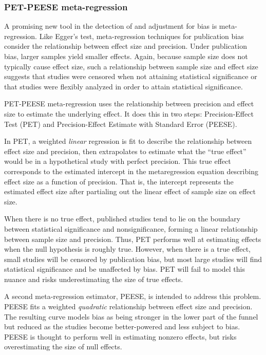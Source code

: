 \documentclass[man]{apa6}
\begin{document}
\subsubsection{PET-PEESE meta-regression}
A promising new tool in the detection of and adjustment for bias is meta-regression. Like Egger's test, meta-regression techniques for publication bias consider the relationship between effect size and precision. Under publication bias, larger samples yield smaller effects. Again, because sample size does not typically cause effect size, such a relationship between sample size and effect size suggests that studies were censored when not attaining statistical significance or that studies were flexibly analyzed in order to attain statistical significance. 

PET-PEESE meta-regression \citep{Stanley:Doucouliagos:2013} %
uses the relationship between precision and effect size to estimate the underlying effect. It does this in two steps: Precision-Effect Test (PET) and Precision-Effect Estimate with Standard Error (PEESE). 

In PET, a weighted {\em linear} regression is fit to describe the relationship between effect size and precision, then extrapolates to estimate what the ``true effect'' would be in a hypothetical study with perfect precision. This true effect corresponds to the estimated intercept in the metaregression equation describing effect size as a function of precision. That is, the intercept represents the estimated effect size after partialing out the linear effect of sample size on effect size.

When there is no true effect, published studies tend to lie on the boundary between statistical significance and nonsignificance, forming a linear relationship between sample size and precision. Thus, PET performs well at estimating effects when the null hypothesis is roughly true. However, when there is a true effect, small studies will be censored by publication bias, but most large studies will find statistical significance and be unaffected by bias. PET will fail to model this nuance and risks underestimating the size of true effects.

A second meta-regression estimator, PEESE, is intended to address this problem. PEESE fits a weighted {\em quadratic} relationship between effect size and precision. The resulting curve models bias as being stronger in the lower part of the funnel but reduced as the studies become better-powered and less subject to bias. PEESE is thought to perform well in estimating nonzero effects, but risks overestimating the size of null effects.
\end{document}
